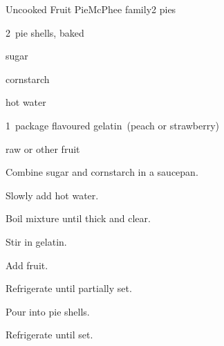 \begin{recipe}{Uncooked Fruit Pie}{McPhee family}{2 pies}

\begin{ingredients}
\item 2~pie shells, baked
\item {} sugar
\item {} cornstarch
\item \C{1\half} hot water
\item 1~package flavoured gelatin~(peach or strawberry)
\item {} raw  or other fruit
\end{ingredients}

\begin{directions}
\item Combine sugar and cornstarch in a saucepan.
\item Slowly add hot water.
\item Boil mixture until thick and clear.
\item Stir in gelatin.
\item Add fruit.
\item Refrigerate until partially set.
\item Pour into pie shells.
\item Refrigerate until set.
\end{directions}

\end{recipe}
